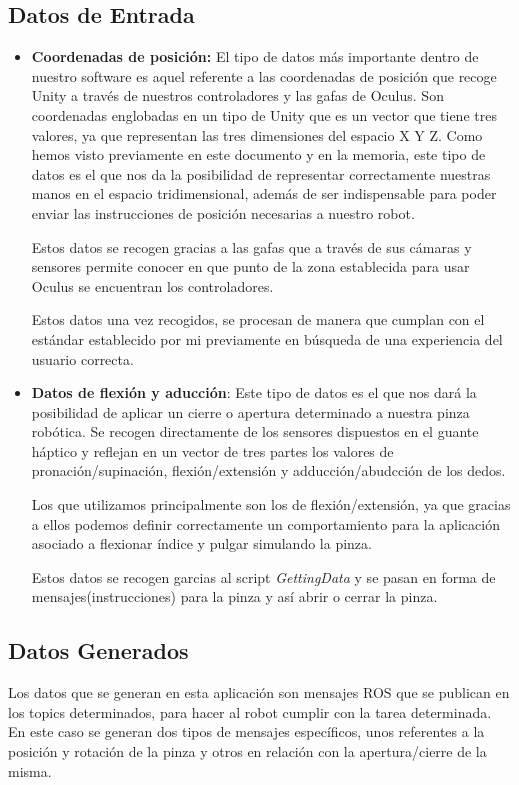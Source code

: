 \subsection{Datos de Entrada}
    \begin{itemize}
        \item \textbf{Coordenadas de posición:} El tipo de datos más importante dentro de nuestro software es aquel referente a las coordenadas de posición que recoge Unity a través de nuestros controladores y las gafas de Oculus. Son coordenadas englobadas en un tipo de Unity que es un vector que tiene tres valores, ya que representan las tres dimensiones del espacio X Y Z.
        Como hemos visto previamente en este documento y en la memoria, este tipo de datos es el que nos da la posibilidad de representar correctamente nuestras manos en el espacio tridimensional, además de ser indispensable para poder enviar las instrucciones de posición necesarias a nuestro robot.
        
        Estos datos se recogen gracias a las gafas que a través de sus cámaras y sensores permite conocer en que punto de la zona establecida para usar Oculus se encuentran los controladores.
        
        Estos datos una vez recogidos, se procesan de manera que cumplan con el estándar establecido por mi previamente en búsqueda de una experiencia del usuario correcta. 
        
        \item \textbf{Datos de flexión y aducción}: Este tipo de datos es el que nos dará la posibilidad de aplicar un cierre o apertura determinado a nuestra pinza robótica. Se recogen directamente de los sensores dispuestos en el guante háptico y reflejan en un vector de tres partes los valores de pronación/supinación, flexión/extensión y adducción/abudcción de los dedos. 
        
        Los que utilizamos principalmente son los de flexión/extensión, ya que gracias a ellos podemos definir correctamente un comportamiento para la aplicación asociado a flexionar índice y pulgar simulando la pinza.
        
        Estos datos se recogen garcias al script \textit{GettingData}  y se pasan en forma de mensajes(instrucciones) para la pinza y así abrir o cerrar la pinza.
  \end{itemize}
  
\subsection{Datos Generados}
        Los datos que se generan en esta aplicación son mensajes ROS que se publican en los topics determinados, para hacer al robot cumplir con la tarea determinada. En este caso se generan dos tipos de mensajes específicos, unos referentes a la posición y rotación de la pinza y otros en relación con la apertura/cierre de la misma. 
        
